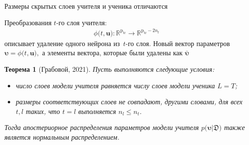 \documentclass[10pt,pdf,hyperref={unicode}]{beamer}
\newtheorem{rustheorem}{Теорема}
\begin{document}
\begin{frame}{Размеры скрытых слоев учителя и ученика отличаются}

Преобразования $t$-го слоя учителя:
\[
\begin{aligned}
\phi\bigr(t, \textbf{u}\bigr) : \mathbb{R}^{\text{p}_{\text{tr}}} \to \mathbb{R}^{\text{p}_{\text{tr}}-2n_t}
\end{aligned}
\]
описывает удаление одного нейрона из~$t$-го слоя. Новый вектор параметров $\bm{\upsilon} =  \phi\bigr(t, \textbf{u}\bigr),$ а элементы вектора, которые были удалены как $\bar{\bm{\upsilon}}$

\begin{rustheorem}[Грабовой, 2021]
Пусть выполняются следующие условия:
\begin{itemize}
 распределение параметров $p\bigr(\textbf{u}|\mathfrak{D}\bigr) = \mathcal{N}\bigr(\textbf{m}, \bm{\Sigma}\bigr);$
\item число слоев модели учителя равняется числу слоев модели ученика $L=T$;
\item размеры соответствующих слоев не совпадают, другими словами, для всех $t, l$ таких, что $t=l$ выполняется $n_l \leq n_t$.
\end{itemize}
Тогда апостериорное распределения параметров модели учителя $p\bigr(\bm{\upsilon}|\mathfrak{D}\bigr)$ также является нормальным распределением.
\end{rustheorem}

\end{frame}
\end{document}
